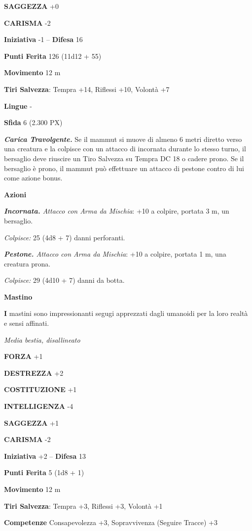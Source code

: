 \begin{multicols}{2}
\textbf{SAGGEZZA} +0

\textbf{CARISMA} -2

\textbf{Iniziativa} -1 -- \textbf{Difesa} 16

\textbf{Punti Ferita} 126 (11d12 + 55)

\textbf{Movimento} 12 m

\textbf{Tiri Salvezza}: Tempra +14, Riflessi +10, Volontà +7

\textbf{Lingue} -

\textbf{Sfida} 6 (2.300 PX)

\textit{\textbf{Carica Travolgente.}} Se il mammut si muove di almeno 6 metri diretto verso una creatura e la colpisce con un attacco di incornata durante lo stesso turno, il bersaglio deve riuscire un Tiro Salvezza su Tempra DC 18 o cadere prono. Se il bersaglio è prono, il mammut può effettuare un attacco di pestone contro di lui come azione bonus.

\textbf{Azioni}

\textit{\textbf{Incornata.} Attacco con Arma da Mischia}: +10 a colpire, portata 3 m, un bersaglio.

\textit{Colpisce:} 25 (4d8 + 7) danni perforanti.

\textit{\textbf{Pestone.} Attacco con Arma da Mischia}: +10 a colpire, portata 1 m, una creatura prona.

\textit{Colpisce:} 29 (4d10 + 7) danni da botta.

\medskip\textbf{Mastino}

\textbf{I} mastini sono impressionanti segugi apprezzati dagli umanoidi per la loro realtà e sensi affinati.

\textit{Media bestia, disallineato}

\textbf{FORZA} +1

\textbf{DESTREZZA} +2

\textbf{COSTITUZIONE} +1

\textbf{INTELLIGENZA} -4

\textbf{SAGGEZZA} +1

\textbf{CARISMA} -2

\textbf{Iniziativa} +2 -- \textbf{Difesa} 13

\textbf{Punti Ferita} 5 (1d8 + 1)

\textbf{Movimento} 12 m

\textbf{Tiri Salvezza}: Tempra +3, Riflessi +3, Volontà +1

\textbf{Competenze} Consapevolezza +3, Sopravvivenza (Seguire Tracce) +3


\end{multicols}
